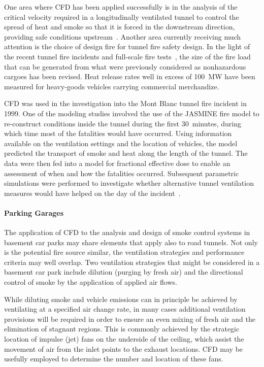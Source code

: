 \documentclass[graybox]{svmult}
\begin{document}
One area where CFD has been applied successfully is in the analysis of the critical velocity required in a longitudinally ventilated tunnel to control the spread of heat and smoke so that it is forced in the downstream direction, providing safe conditions upstream~\cite{Hwang}. Another area currently receiving much attention is the choice of design fire for tunnel fire safety design. In the light of the recent tunnel fire incidents and full-scale fire tests~\cite{Ingason}, the size of the fire load that can be generated from what were previously considered as nonhazardous cargoes has been revised. Heat release rates well in excess of 100~MW have been measured for heavy-goods vehicles carrying commercial merchandize.

CFD was used in the investigation into the Mont Blanc tunnel fire incident in 1999. One of the modeling studies involved the use of the JASMINE fire model to re-construct conditions inside the tunnel during the first 30~minutes, during which time most of the fatalities would have occurred. Using information available on the ventilation settings and the location of vehicles, the model predicted the transport of smoke and heat along the length of the tunnel. The data were then fed into a model for fractional effective dose to enable an assessment of when and how the fatalities occurred. Subsequent parametric simulations were performed to investigate whether alternative tunnel ventilation measures would have helped on the day of the incident~\cite{Miles:2004}.


\paragraph{Parking Garages}

The application of CFD to the analysis and design of smoke control systems in basement car parks may share elements that apply also to road tunnels. Not only is the potential fire source similar, the ventilation strategies and performance criteria may well overlap. Two ventilation strategies that might be considered in a basement car park include dilution (purging by fresh air) and the directional control of smoke by the application of applied air flows.

While diluting smoke and vehicle emissions can in principle be achieved by ventilating at a specified air change rate, in many cases additional ventilation provisions will be required in order to ensure an even mixing of fresh air and the elimination of stagnant regions. This is commonly achieved by the strategic location of impulse (jet) fans on the underside of the ceiling, which assist the movement of air from the inlet points to the exhaust locations. CFD may be usefully employed to determine the number and location of these fans.
\end{document}
